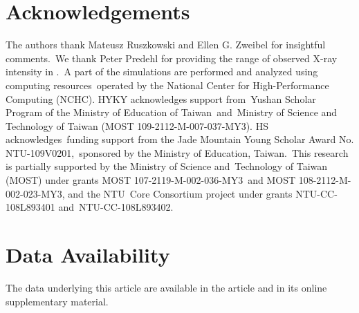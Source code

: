 \documentclass[twocolumn]{aastex631}
\begin{document}
\section{Acknowledgements}
The authors thank Mateusz Ruszkowski and Ellen G. Zweibel for insightful comments.\
We thank Peter Predehl for providing the range of observed X-ray intensity in .\
A part of the simulations are performed and analyzed using computing resources\
operated by the National Center for High-Performance Computing (NCHC).
HYKY acknowledges support from\
Yushan Scholar Program of the Ministry of Education of Taiwan\
and\
Ministry of Science and Technology of Taiwan (MOST 109-2112-M-007-037-MY3).
HS acknowledges\
funding support from the Jade Mountain Young Scholar Award No. NTU-109V0201,\
sponsored by the Ministry of Education, Taiwan.\
This research is partially supported by the Ministry of Science and\
Technology of Taiwan (MOST) under grants MOST 107-2119-M-002-036-MY3\
and MOST 108-2112-M-002-023-MY3, and the NTU\
Core Consortium project under grants NTU-CC-108L893401 and\
NTU-CC-108L893402.

\section*{Data Availability}
The data underlying this article are available in the article and in its online supplementary material.






\end{document}
